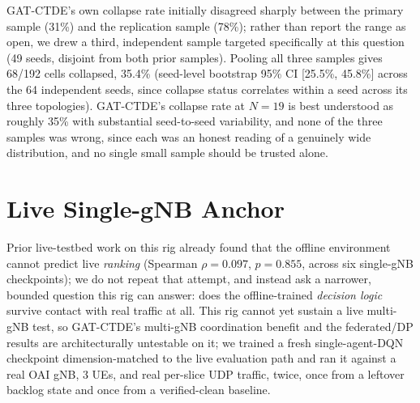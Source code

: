 \documentclass[pdflatex,sn-basic,Numbered]{sn-jnl}%
\begin{document}
GAT-CTDE's own collapse rate initially disagreed sharply between the
primary sample (31\%) and the replication sample (78\%); rather than
report the range as open, we drew a third, independent sample targeted
specifically at this question (49 seeds, disjoint from both prior
samples). Pooling all three samples gives 68/192 cells collapsed, 35.4\% (seed-level bootstrap 95\% CI [25.5\%, 45.8\%] across the 64 independent seeds, since collapse status correlates within a seed across its three topologies). GAT-CTDE's collapse rate at $N=19$ is best understood as roughly 35\% with substantial seed-to-seed variability, and none of the three samples was wrong, since each was an honest reading of a genuinely wide distribution, and no single small sample should be trusted alone.

\section{Live Single-gNB Anchor}
\label{sec:results-m8}
Prior live-testbed work on this rig already found that the offline
environment cannot predict live \emph{ranking} (Spearman
$\rho=0.097$, $p=0.855$, across six single-gNB checkpoints); we do not
repeat that attempt, and instead ask a narrower, bounded question this
rig can answer: does the offline-trained \emph{decision logic} survive
contact with real traffic at all. This rig cannot yet sustain a live
multi-gNB test, so GAT-CTDE's multi-gNB coordination benefit and the
federated/DP results are architecturally untestable on it; we trained a fresh single-agent-DQN checkpoint dimension-matched to the live evaluation path and ran it against a real OAI gNB, 3 UEs, and real per-slice UDP traffic, twice, once from a leftover backlog state and once from a verified-clean baseline.
\end{document}
